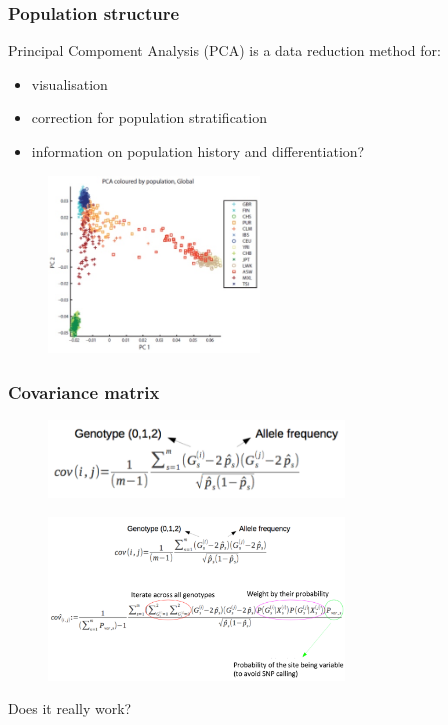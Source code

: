 
\begin{frame}
\frametitle{Population structure}

	Principal Compoment Analysis (PCA) is a data reduction method for:
	\begin{itemize}
		\item visualisation
		\item correction for population stratification
		\item information on population history and differentiation?
	\end{itemize}

	\begin{figure}
                \includegraphics[width=0.5\textwidth]{Pics/pca.jpg}
        \end{figure}

\end{frame}


\begin{frame}
\frametitle{Covariance matrix}

	\begin{figure}
                \includegraphics[width=0.70\textwidth]{Pics/covar.png}
        \end{figure}

	\pause

	\begin{figure}
                \includegraphics[width=0.70\textwidth]{Pics/covar_ngs.png}
        \end{figure}

	\footnotesize{Does it really work?}

\end{frame}


